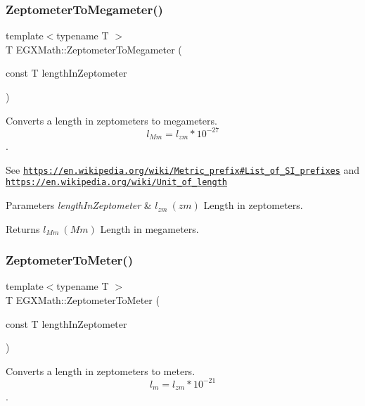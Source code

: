 \subsubsection{\texorpdfstring{Zeptometer\+To\+Megameter()}{ZeptometerToMegameter()}}
{\footnotesize\ttfamily template$<$typename T $>$ \\
T E\+G\+X\+Math\+::\+Zeptometer\+To\+Megameter (\begin{DoxyParamCaption}\item[{const T}]{length\+In\+Zeptometer }\end{DoxyParamCaption})}



Converts a length in zeptometers to megameters. \[ l_{Mm}=l_{zm} * 10^{-27} \]. 

See \href{https://en.wikipedia.org/wiki/Metric_prefix#List_of_SI_prefixes}{\tt https\+://en.\+wikipedia.\+org/wiki/\+Metric\+\_\+prefix\#\+List\+\_\+of\+\_\+\+S\+I\+\_\+prefixes} and \href{https://en.wikipedia.org/wiki/Unit_of_length}{\tt https\+://en.\+wikipedia.\+org/wiki/\+Unit\+\_\+of\+\_\+length} 
\begin{DoxyParams}{Parameters}
{\em length\+In\+Zeptometer} & $ l_{zm}\ (zm)$ Length in zeptometers. \\
\hline
\end{DoxyParams}
\begin{DoxyReturn}{Returns}
$ l_{Mm}\ (Mm)$ Length in megameters. 
\end{DoxyReturn}
\mbox{\label{group___e_g_x_math-_conversions-_length_conversions-_zeptometer-_s_i_gaf51d88eb55e387d6ee07a02f2229be97}} 
\subsubsection{\texorpdfstring{Zeptometer\+To\+Meter()}{ZeptometerToMeter()}}
{\footnotesize\ttfamily template$<$typename T $>$ \\
T E\+G\+X\+Math\+::\+Zeptometer\+To\+Meter (\begin{DoxyParamCaption}\item[{const T}]{length\+In\+Zeptometer }\end{DoxyParamCaption})}



Converts a length in zeptometers to meters. \[ l_{m}=l_{zm} * 10^{-21} \]. 


